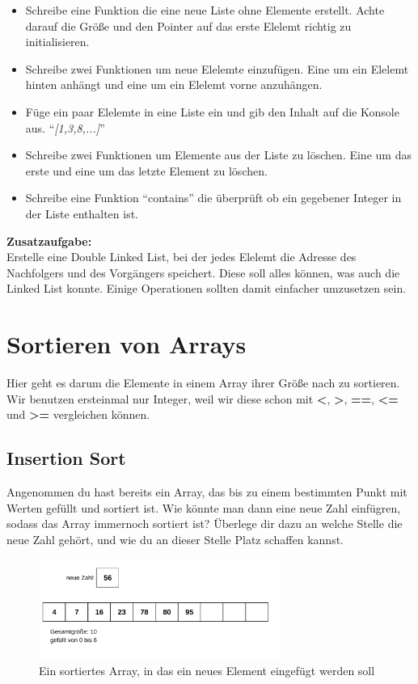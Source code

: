 \documentclass[c_worksheet.tex]{subfiles}
\begin{document}
\begin{itemize}
  \item Schreibe eine Funktion die eine neue Liste ohne Elemente erstellt. Achte darauf die Größe und den Pointer auf das erste Elelemt richtig zu initialisieren.
  \item Schreibe zwei Funktionen um neue Elelemte einzufügen. Eine um ein Elelemt hinten anhängt und eine um ein Elelemt vorne anzuhängen.
  \item Füge ein paar Elelemte in eine Liste ein und gib den Inhalt auf die Konsole aus. ``\textit{[1,3,8,...]}''
  \item Schreibe zwei Funktionen um Elemente aus der Liste zu löschen. Eine um das erste und eine um das letzte Element zu löschen.
  \item Schreibe eine Funktion ``contains'' die überprüft ob ein gegebener Integer in der Liste enthalten ist.
\end{itemize}

\textbf{Zusatzaufgabe:}\\
Erstelle eine Double Linked List, bei der jedes Elelemt die Adresse des Nachfolgers und des Vorgängers speichert. Diese soll alles können, was auch die Linked List konnte. Einige Operationen sollten damit einfacher umzusetzen sein.

\section{Sortieren von Arrays}

Hier geht es darum die Elemente in einem Array ihrer Größe nach zu sortieren. Wir benutzen ersteinmal nur Integer, weil wir diese schon mit \textbf{<}, \textbf{>}, \textbf{==}, \textbf{<=} und \textbf{>=} vergleichen können.

\subsection{Insertion Sort}
Angenommen du hast bereits ein Array, das bis zu einem bestimmten Punkt mit Werten gefüllt und sortiert ist. Wie könnte man dann eine neue Zahl einfügren, sodass das Array immernoch sortiert ist? Überlege dir dazu an welche Stelle die neue Zahl gehört, und wie du an dieser Stelle Platz schaffen kannst.

\begin{figure}[h]
\centering
\includegraphics[width=0.7\textwidth]{./Grafiken/Aufgaben/insertionSort}
\caption{Ein sortiertes Array, in das ein neues Element eingefügt werden soll} 
\end{figure}
\end{document}
